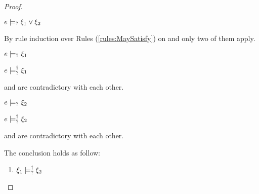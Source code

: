 \begin{proof}
\begin{byCases}
\begin{byCases}
  \end{byCases}

\item[\text{(\ref{rule:CMSPossibly})}]
  \begin{pfsteps*}
  \item $e \models_{?} \xi_1 \vee \xi_2$  
  \end{pfsteps*}
  By rule induction over Rules (\ref{rules:MaySatisfy}) on  and only two of them apply.
  \begin{byCases}

  \item[\text{(\ref{rule:CMSOr1})}]
    \begin{pfsteps*}
    \item $e \models_{?} \xi_1$  
    \item $e \models_{?}^{\dag} \xi_1$  
    \end{pfsteps*}
     and  are contradictory with each other.

  \item[\text{(\ref{rule:CMSOr2})}]
    \begin{pfsteps*}
    \item $e \models_{?} \xi_2$  
    \item $e \models_{?}^{\dag} \xi_2$  
    \end{pfsteps*}
     and  are contradictory with each other.

  \end{byCases}
\end{byCases}
The conclusion holds as follow:
\begin{enumerate}
  \item $\xi_1 \models_{?}^{\dag} \xi_2$
\end{enumerate}
\resetpfcounter
\end{proof}

